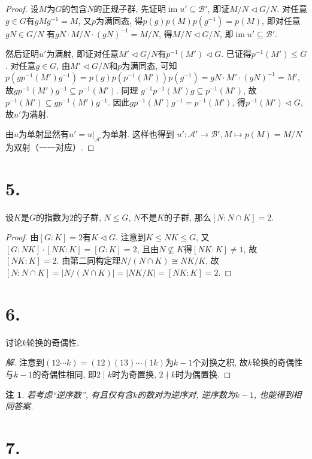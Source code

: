 \documentclass[12pt, a4paper, fontset=windows]{ctexart}
\newcommand{\abs}[1]{\left|{#1}\right|}
\newcommand{\im}{\operatorname{im}}
\newcommand{\isom}{\cong} %
\newcommand{\kh}[1]{（{#1}）} %
\newcommand{\yh}[1]{“{#1}”} %
\newtheorem*{remark}{注}
\newenvironment{solution}{\begin{proof}[解]}{\end{proof}}
\begin{document}
\begin{proof}
设$M$为$G$的包含$N$的正规子群, 先证明$\im u'\subseteq\mathcal{B}'$, 
即证$M/N\lhd G/N$. 对任意$g\in G$有$gMg^{-1}=M$, 
又$p$为满同态, 得$p(g)p(M)p(g^{-1})=p(M)$, 即对任意$gN\in G/N$
有$gN\cdot M/N\cdot(gN)^{-1}=M/N$, 
得$M/N\lhd G/N$, 即$\im u'\subseteq\mathcal{B}'$. 

然后证明$u'$为满射, 即证对任意$M'\lhd G/N$有$p^{-1}(M')\lhd G$. 
已证得$p^{-1}(M')\le G$. 对任意$g\in G$, 由$M'\lhd G/N$和$p$为满同态, 可知
$p(gp^{-1}(M')g^{-1})=p(g)p(p^{-1}(M'))p(g^{-1})=gN\cdot M'\cdot(gN)^{-1}=M'$, 
故$gp^{-1}(M')g^{-1}\subseteq p^{-1}(M')$. 同理
$g^{-1}p^{-1}(M')g\subseteq p^{-1}(M')$, 故$p^{-1}(M')\subseteq gp^{-1}(M')g^{-1}$. 
因此$gp^{-1}(M')g^{-1}=p^{-1}(M')$, 得$p^{-1}(M')\lhd G$, 故$u'$为满射. 

由$u$为单射显然有$u'=u|_{\mathcal{A}'}$为单射. 这样也得到
$u':\mathcal{A}'\to\mathcal{B}',M\mapsto p(M)=M/N$为双射\kh{一一对应}. 
\end{proof}

\section*{5.}

设$K$是$G$的指数为$2$的子群, $N\le G$, $N$不是$K$的子群, 
那么$[N:N\cap K]=2$. 

\begin{proof}
由$[G:K]=2$有$K\lhd G$. 
注意到$K\le NK\le G$, 又$[G:NK]\cdot[NK:K]=[G:K]=2$, 
且由$N\not\subseteq K$得$[NK:K]\ne 1$, 故$[NK:K]=2$. 
由第二同构定理$N/(N\cap K)\isom NK/K$, 故
$[N:N\cap K]=\abs{N/(N\cap K)}=\abs{NK/K}=[NK:K]=2$. 
\end{proof}

\section*{6.}

讨论$k$轮换的奇偶性. 

\begin{solution}
注意到$(12\cdots k)=(12)(13)\cdots(1k)$为$k-1$个对换之积, 
故$k$轮换的奇偶性与$k-1$的奇偶性相同, 即$2\mid k$时为奇置换, 
$2\nmid k$时为偶置换. 
\end{solution}

\begin{remark}
若考虑\yh{逆序数}, 有且仅有含$k$的数对为逆序对, 
逆序数为$k-1$, 也能得到相同答案. 
\end{remark}

\section*{7.}
\end{document}
